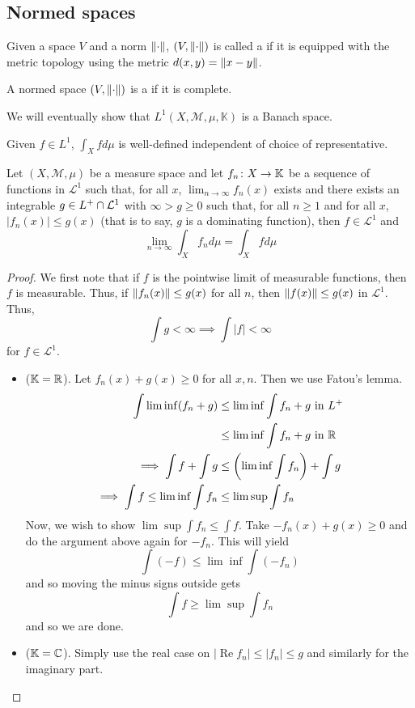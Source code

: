 \documentclass[11pt,leqno,oneside]{amsbook}
\numberwithin{thm}{section}
\newcommand{\M}{\mathcal{M}}
\newcommand{\cL}{\mathcal{L}}
\newcommand{\K}{\mathbb{K}} %
\begin{document}
\subsection{Normed spaces}
\begin{defn}
  Given a space \(V\) and a norm \(\norm\),  \((V,\norm)\) is called a
   if it is equipped with the metric topology using
  the metric \(d(x,y) = \norm[x-y]\). 
\end{defn}
\begin{defn}
  A normed space \((V,\norm)\) is a  if it is
  complete. 
\end{defn}
We will eventually show that \(L^1(X,\M,\mu,\mathbb{K})\) is a Banach
space.
\begin{rmk}
  Given \(f \in L^1\), \(\int_X f d\mu\) is well-defined independent
  of choice of representative.
\end{rmk}
\begin{thm}
  Let \((X,\M,\mu)\) be a measure space and let \(f_n \from X \to
  \mathbb{K}\) be a sequence of functions in \(\cL^1\) such that, for
  all \(x\), \(\lim_{n \to \infty} f_n(x)\) exists and there exists an
  integrable \(g \in L^+ \intersect \cL^1\) with \(\infty > g \geq
  0\) such that, for all \(n \geq 1\) and for all \(x\), \(|f_n(x)|
  \leq g(x)\) (that is to say, \(g\) is a dominating function), then
  \(f \in \cL^1\) and \[
    \lim_{n \to \infty} \int_X f_n d\mu = \int_X f d\mu
  \]
\end{thm}
\begin{proof}
  We first note that if \(f\) is the pointwise limit of measurable
  functions, then \(f\) is measurable. Thus, if \(\norm[f_n(x)] \leq
  g(x)\) for all \(n\), then \(\norm[f(x)] \leq g(x)\) in
  \(\cL^1\). Thus, \[
    \int g < \infty \implies \int |f| < \infty
  \]
  for \(f \in \cL^1\).
  \begin{itemize}
  \item (\(\K = \R\)). Let \(f_n(x) + g(x) \geq 0\) for all
    \(x,n\). Then we use Fatou's lemma.
    \begin{align*}
      \int \lim \inf (f_n+g)
      & \leq \lim \inf \int f_n+g \text{ in }L^+ \\
      & \leq \lim \inf \int f_n+g \text{ in }\R \\
      \implies \int f + \int g & \leq \left( \lim \inf \int f_n \right)
      + \int g \\
      \implies \int f \leq \lim \inf \int f_n & \leq \lim \sup \int f_n
    \end{align*}
    Now, we wish to show \(\lim \sup \int f_n \leq \int f\). Take
    \(-f_n(x) + g(x) \geq 0\) and do the argument above again for
    \(-f_n\). This will yield \[
      \int (-f) \leq \lim \inf \int (-f_n)
    \]
    and so moving the minus signs outside gets \[
      \int f \geq \lim \sup \int f_n
    \]
    and so we are done.
  \item (\(\K = \C\)). Simply use the real case on \(|\operatorname{Re}
   f_n| \leq |f_n| \leq g\) and similarly for the imaginary part.
  \end{itemize}
\end{proof}
\end{document}
